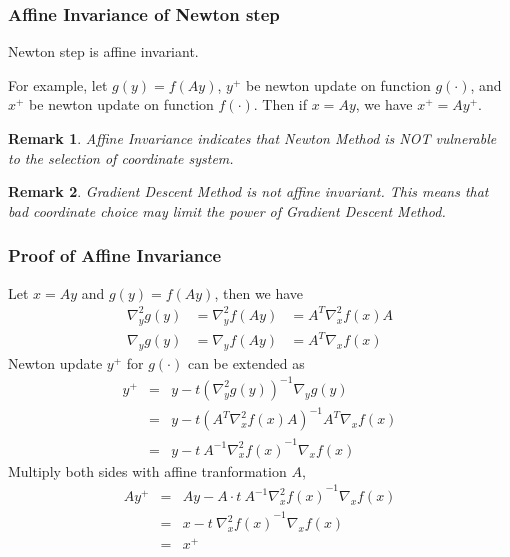 \documentclass{beamer}
\newcommand{\be}{\begin{eqnarray}}
\newcommand{\ee}{\end{eqnarray}}
\newtheorem{remark}{Remark}
\begin{document}
%

\newcommand{\gradient}[3]{\ensuremath{\nabla_{#1} #2 (#3)}}
\newcommand{\hessian}[3]{\ensuremath{\nabla^2_{#1} #2 (#3)}}
\begin{frame}
\frametitle{Affine Invariance of Newton step}
\begin{lemma}
    Newton step is affine invariant. 
\end{lemma}
For example, let $g(y) = f(Ay)$, $y^{+}$ be newton update on function
$g(\cdot)$, and 
$x^{+}$ be newton update on function $f(\cdot)$. 
Then if $x=Ay$, we have $x^{+} = Ay^{+}$.
\begin{remark}
    Affine Invariance indicates that Newton Method is NOT vulnerable to the
    selection of coordinate system. 
\end{remark}
\begin{remark}
    Gradient Descent Method is not affine invariant. This means
    that bad coordinate choice may limit the power of Gradient Descent Method.
\end{remark}
\end{frame}
\begin{frame}
\frametitle{Proof of Affine Invariance}
    Let $x = Ay$ and $g(y) = f(Ay)$, then we have
    \be
    \hessian{y}{g}{y} &= \hessian{y}{f}{Ay} &= A^T \hessian{x}{f}{x} A \\
    \gradient{y}{g}{y} &= \gradient{y}{f}{Ay} &= A^T \gradient{x}{f}{x}
    \ee
    Newton update $y^{+}$ for $g(\cdot)$ can be extended as
    \be
    y^{+} &=& y - t(\hessian{y}{g}{y})^{-1} \gradient{y}{g}{y} \\
    &=& y - t(A^T \hessian{x}{f}{x} A)^{-1} A^T \gradient{x}{f}{x} \\
    &=& y - t\ A^{-1} \hessian{x}{f}{x}^{-1} \gradient{x}{f}{x}
    \ee
    Multiply both sides with affine tranformation $A$, 
    \be
    Ay^{+} &=& Ay - A \cdot t\ A^{-1} \hessian{x}{f}{x}^{-1} \gradient{x}{f}{x} \\
    &=& x - t\ \hessian{x}{f}{x}^{-1} \gradient{x}{f}{x} \\
    &=& x^{+}
    \ee
\end{frame}
\end{document}

